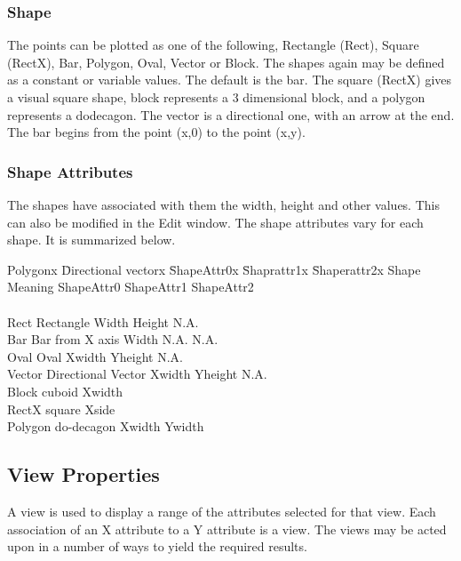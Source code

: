 \subsubsection{Shape}

The points can be plotted as one of the following, Rectangle (Rect),
Square (RectX), Bar, Polygon, Oval, Vector or Block. The shapes again
may be defined as a constant or variable values. The default is the
bar. The square (RectX) gives a visual square shape, block represents
a 3 dimensional block, and a polygon represents a dodecagon. The
vector is a directional one, with an arrow at the end. The bar begins
from the point (x,0) to the point (x,y).

\subsubsection{Shape Attributes}

The shapes have associated with them the width, height and other
values. This can also be modified in the Edit window. The shape
attributes vary for each shape. It is summarized below.

\begin{tabbing}
Polygonx \= Directional vectorx \= ShapeAttr0x \= Shaprattr1x \= Shaperattr2x \kill
Shape \> Meaning \> ShapeAttr0 \> ShapeAttr1 \> ShapeAttr2 \\ \\
Rect  \> Rectangle \>  Width \> Height \> N.A.  \\
Bar   \> Bar from X axis\> Width \> N.A. \> N.A. \\
Oval  \> Oval \> Xwidth \> Yheight \> N.A.\\
Vector \> Directional Vector \> Xwidth \> Yheight \> N.A. \\
Block \> cuboid \> Xwidth \>\\
RectX \> square \> Xside\\
Polygon \> do-decagon \> Xwidth \> Ywidth\\  
\end{tabbing}

\subsection{View Properties}

A view is used to display a range of the attributes selected for that
view. Each association of an X attribute to a Y attribute is a
view. The views may be acted upon in a number of ways to yield the
required results.

